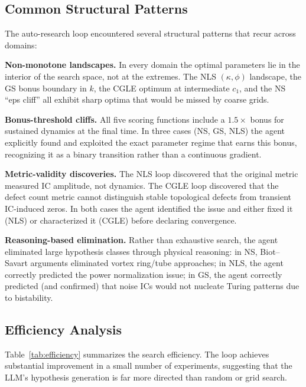 \documentclass[11pt]{article}
\begin{document}
\subsection{Common Structural Patterns}

The auto-research loop encountered several structural patterns that recur
across domains:

\noindent\textbf{Non-monotone landscapes.}
In every domain the optimal parameters lie in the interior of the search
space, not at the extremes. The NLS $(\kappa, \phi)$ landscape, the GS
bonus boundary in $k$, the CGLE optimum at intermediate $c_1$, and the NS
``eps cliff'' all exhibit sharp optima that would be missed by coarse grids.

\noindent\textbf{Bonus-threshold cliffs.}
All five scoring functions include a $1.5\times$ bonus for sustained
dynamics at the final time. In three cases (NS, GS, NLS) the agent explicitly
found and exploited the exact parameter regime that earns this bonus,
recognizing it as a binary transition rather than a continuous gradient.

\noindent\textbf{Metric-validity discoveries.}
The NLS loop discovered that the original metric measured IC amplitude,
not dynamics. The CGLE loop discovered that the defect count metric cannot
distinguish stable topological defects from transient IC-induced zeros.
In both cases the agent identified the issue and either fixed it (NLS)
or characterized it (CGLE) before declaring convergence.

\noindent\textbf{Reasoning-based elimination.}
Rather than exhaustive search, the agent eliminated large hypothesis classes
through physical reasoning:
in NS, Biot--Savart arguments eliminated vortex ring/tube approaches;
in NLS, the agent correctly predicted the power normalization issue;
in GS, the agent correctly predicted (and confirmed) that noise ICs would
not nucleate Turing patterns due to bistability.

\subsection{Efficiency Analysis}

Table~\ref{tab:efficiency} summarizes the search efficiency.
The loop achieves substantial improvement in a small number of experiments,
suggesting that the LLM's hypothesis generation is far more directed than
random or grid search.
\end{document}
